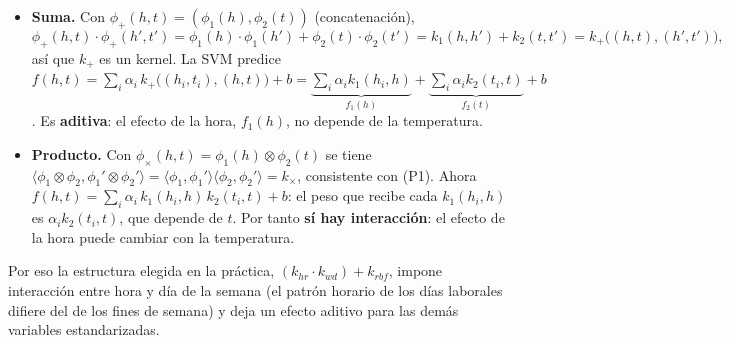 \begin{itemize}
\item \textbf{Suma.} Con $\phi_+(h,t)=(\phi_1(h),\phi_2(t))$ (concatenación),
\[
\phi_+(h,t)\cdot\phi_+(h',t')=\phi_1(h)\cdot\phi_1(h')+\phi_2(t)\cdot\phi_2(t')
=k_1(h,h')+k_2(t,t')=k_+\bigl((h,t),(h',t')\bigr),
\]
así que $k_+$ es un kernel. La SVM predice
$f(h,t)=\sum_i\alpha_i\,k_+\bigl((h_i,t_i),(h,t)\bigr)+b
=\underbrace{\sum_i\alpha_i k_1(h_i,h)}_{f_1(h)}+\underbrace{\sum_i\alpha_i k_2(t_i,t)}_{f_2(t)}+b$.
Es \textbf{aditiva}: el efecto de la hora, $f_1(h)$, no depende de la
temperatura.

\item \textbf{Producto.} Con $\phi_\times(h,t)=\phi_1(h)\otimes\phi_2(t)$ se
tiene $\langle\phi_1\otimes\phi_2,\phi_1'\otimes\phi_2'\rangle=
\langle\phi_1,\phi_1'\rangle\langle\phi_2,\phi_2'\rangle=k_\times$, consistente
con (P1). Ahora
$f(h,t)=\sum_i\alpha_i\,k_1(h_i,h)\,k_2(t_i,t)+b$:
el peso que recibe cada $k_1(h_i,h)$ es $\alpha_i k_2(t_i,t)$, que depende de
$t$. Por tanto \textbf{sí hay interacción}: el efecto de la hora puede cambiar
con la temperatura.
\end{itemize}

Por eso la estructura elegida en la práctica,
$(k_{hr}\cdot k_{wd})+k_{rbf}$, impone interacción entre hora y día de la
semana (el patrón horario de los días laborales difiere del de los fines de
semana) y deja un efecto aditivo para las demás variables estandarizadas.
